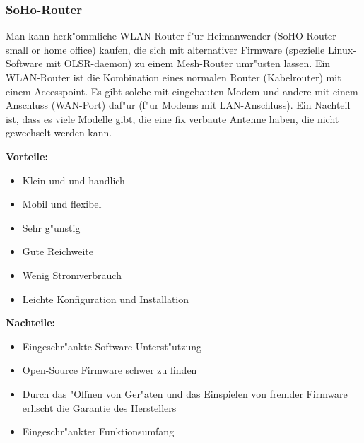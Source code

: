 \subsubsection{SoHo-Router}

Man kann herk"ommliche WLAN-Router f"ur Heimanwender (SoHO-Router - small
or home office) kaufen, die sich mit alternativer Firmware (spezielle
Linux-Software mit OLSR-daemon) zu einem Mesh-Router umr"usten
lassen. Ein WLAN-Router ist die Kombination eines normalen Router
(Kabelrouter) mit einem Accesspoint. Es gibt solche mit eingebauten
Modem und andere mit einem Anschluss (WAN-Port) daf"ur (f"ur Modems mit
LAN-Anschluss). Ein Nachteil ist, dass es viele Modelle gibt, die eine
fix verbaute Antenne haben, die nicht gewechselt werden kann.

\textbf{Vorteile:}

\begin{itemize}
	\item Klein und	und handlich
	\item Mobil und flexibel
	\item Sehr g"unstig
	\item Gute Reichweite
	\item Wenig Stromverbrauch
	\item Leichte Konfiguration und Installation
\end{itemize}

\textbf{Nachteile:}

\begin{itemize}
	\item Eingeschr"ankte Software-Unterst"utzung
	\item Open-Source Firmware schwer zu finden
	\item Durch das "Offnen von Ger"aten und das Einspielen von
	fremder Firmware erlischt die Garantie des Herstellers
	\item Eingeschr"ankter Funktionsumfang
\end{itemize}

